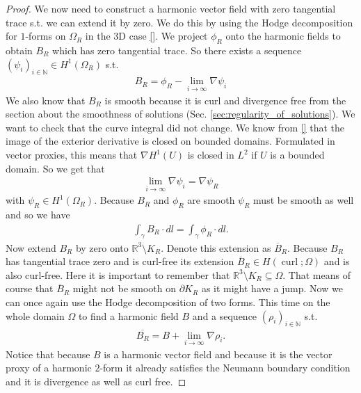 \documentclass[12pt,a4paper]{article}
\numberwithin{equation}{subsection}
\numberwithin{lemma}{subsection}
\theoremstyle{definition}
\DeclareMathOperator{\curl}{curl}
\newcommand{\naturalnum}{\mathbb{N}}
\newcommand{\real}{\mathbb{R}}
\begin{document}
\begin{proof}
    We now need to construct a harmonic vector field with zero tangential trace
    s.t. we can extend it by zero. We do this by using the Hodge 
    decomposition for $1$-forms on $\Omega_R$ in the $3$D case \ref{}.
    We project $\phi_R$ onto the harmonic fields to obtain $B_R$ which has zero 
    tangential trace. So there exists a sequence 
    $(\psi_i)_{i \in \naturalnum} \in H^1(\Omega_R)$ s.t.
    \begin{align*}
        B_R = \phi_R - \lim\limits_{i\rightarrow \infty}\nabla \psi_i
    \end{align*}
    We also know that $B_R$ is smooth because 
    it is curl and divergence free from the section about the 
    smoothness of solutions (Sec. \ref{sec:regularity_of_solutions}). 
    We want to check that the curve
    integral did not change. We know from \ref{} that the 
    image of the exterior derivative is closed on bounded domains. 
    Formulated in vector proxies, this
    means that $\nabla H^1(U)$ is closed in $L^2$ if $U$ is a bounded domain. 
    So we get that 
    \begin{align*}
        \lim\limits_{i\rightarrow \infty}\nabla \psi_i = \nabla \psi_R
    \end{align*}
    with $\psi_R \in H^1(\Omega_R)$. Because $B_R$ and $\phi_R$ are smooth
    $\psi_R$ must be smooth as well and so we have   
    \begin{align*}
        \int_\gamma B_R\cdot dl = \int_\gamma \phi_R\cdot dl.
    \end{align*}
    Now extend $B_R$ by zero onto $\real^3 \setminus K_R$.
    Denote this extension as $\overline{B}_R$.
    Because $B_R$ has tangential trace zero and is curl-free its extension 
    $\overline{B}_R \in H(\curl;\Omega)$ and is also curl-free. 
    Here it is important to remember 
    that $\real^3 \setminus K_R \subseteq \Omega$. 
    That means of course that $\overline{B}_R$ 
    might not be smooth on $\partial K_R$ 
    as it might have a jump. 
    Now we can once again use the Hodge 
    decomposition of two forms. This time on the whole domain $\Omega$ to find 
    a harmonic field $B$ and a sequence $(\rho_i)_{i\in \naturalnum}$
    s.t.
    \begin{align*}
        \overline{B_R} = B 
            +\lim\limits_{i\rightarrow \infty}\nabla \rho_i.
    \end{align*}
    Notice that because $B$ is a harmonic vector field 
    and because it is the vector 
    proxy of a harmonic $2$-form it already satisfies 
    the Neumann boundary condition and it is divergence as well as curl free.

\end{proof}
\end{document}
